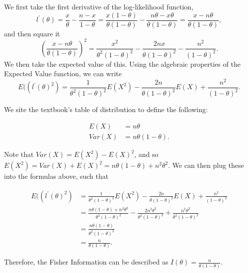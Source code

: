 \documentclass[]{article}
\begin{document}
We first take the first derivative of the log-likelihood function, \[
l^{\prime}(\theta) = \frac{x}{\theta} - \frac{n - x}{1- \theta} = 
\frac{x (1 - \theta)}{\theta(1 - \theta)} - \frac{n\theta - x\theta}{\theta (1 - \theta)} = \frac{x - n \theta}{\theta(1 - \theta)}, 
\] and then square it \[
\left(\frac{x - n \theta}{\theta(1 - \theta)}\right)^2 = \frac{x^2}{\theta^2 (1 - \theta)^2} - \frac{2nx}{\theta(1-\theta)^2} - \frac{n^2}{(1-\theta)^2}.
\] We then take the expected value of this. Using the algebraic
properties of the Expected Value function, we can write \[
E((l^{\prime}(\theta)^2) = \frac{1}{\theta^2(1 - \theta)^2}E(X^2) - \frac{2n}{\theta(1-\theta)^2}E(X) + \frac{n^2}{(1 - \theta)^2}.
\]

We site the textbook's table of distribution to define the following:

\begin{align*} 
E(X) &= n \theta \\
Var(X) &= n \theta (1 - \theta).
\end{align*}

Note that \(Var(X) = E(X^2) - E(X) ^2\), and so
\(E(X^2) = Var(X) + E(X)^2 = n\theta(1 - \theta) + n^2 \theta^2\). We
can then plug these into the formulas above, such that

\begin{align*}
E((l^{\prime}(\theta)^2) &= \frac{1}{\theta^2(1 - \theta)^2}E(X^2) - \frac{2n}{\theta(1-\theta)^2}E(X) + \frac{n^2}{(1 - \theta)^2} \\
&= \frac{n\theta(1 - \theta)  + n^2 \theta^2}{\theta^2(1 - \theta)^2} - 
          \frac{2n^2\theta^2}{\theta^2(1-\theta)^2} + 
          \frac{n^2 \theta^2}{\theta^2(1-\theta)^2} \\
&= \frac{n \theta ( 1- \theta)}{\theta^2 ( 1- \theta)^2} \\
&= \frac{n}{\theta(1-\theta)}.
\end{align*}

Therefore, the Fisher Information can be described as
\(I(\theta)=\frac{n}{\theta (1 - \theta)}\).
\end{document}
